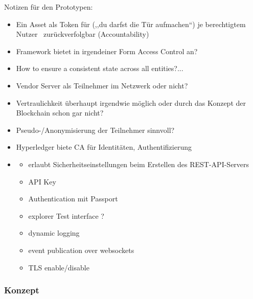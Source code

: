     Notizen für den Prototypen:
    \begin{itemize}[noitemsep]
        \item Ein Asset als Token für (,,du darfst die Tür aufmachen``) je berechtigtem Nutzer \textrightarrow\ zurückverfolgbar (Accountability)
        \item Framework bietet in irgendeiner Form Access Control an?
        \item How to ensure a consistent state across all entities?...
        \item Vendor Server als Teilnehmer im Netzwerk oder nicht?
        \item Vertraulichkeit überhaupt irgendwie möglich oder durch das Konzept der Blockchain schon gar nicht?
        \item Pseudo-/Anonymisierung der Teilnehmer sinnvoll?
        \item Hyperledger biete CA für Identitäten, Authentifizierung
        \item \begin{itemize}
            \item erlaubt Sicherheitseinstellungen beim Erstellen des REST-API-Servers
            \item API Key
            \item Authentication mit Passport
            \item explorer Test interface ?
            \item dynamic logging
            \item event publication over websockets
            \item TLS enable/\-disable
        \end{itemize}
    \end{itemize}
    
    \subsubsection{Konzept}
